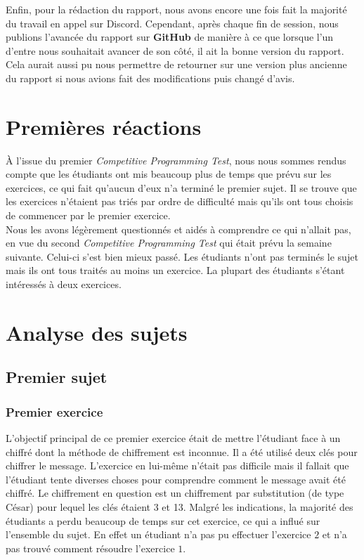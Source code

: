 \documentclass[12pt]{article}
\begin{document}
Enfin, pour la rédaction du rapport, nous avons encore une fois fait la majorité du travail en appel sur Discord. Cependant, après chaque fin de session, nous publions l'avancée du rapport sur \textbf{GitHub} de manière à ce que lorsque l'un d'entre nous souhaitait avancer de son côté, il ait la bonne version du rapport. Cela aurait aussi pu nous permettre de retourner sur une version plus ancienne du rapport si nous avions fait des modifications puis changé d'avis.
\pagebreak

\section{Premières réactions}
À l'issue du premier \textsl{Competitive Programming Test}, nous nous sommes rendus compte que les étudiants ont mis beaucoup plus de temps que prévu sur les exercices, ce qui fait qu'aucun d'eux n'a terminé le premier sujet. Il se trouve que les exercices n'étaient pas triés par ordre de difficulté mais qu'ils ont tous choisis de commencer par le premier exercice.\\
Nous les avons légèrement questionnés et aidés à comprendre ce qui n'allait pas, en vue du second \textsl{Competitive Programming Test} qui était prévu la semaine suivante. Celui-ci s'est bien mieux passé. Les étudiants n'ont pas terminés le sujet mais ils ont tous traités au moins un exercice. La plupart des étudiants s'étant intéressés à deux exercices.

\section{Analyse des sujets}
\subsection{Premier sujet}
\subsubsection{Premier exercice}


L'objectif principal de ce premier exercice était de mettre l'étudiant face à un chiffré dont la méthode de chiffrement est inconnue. Il a été utilisé deux clés pour chiffrer le message. L'exercice en lui-même n'était pas difficile mais il fallait que l'étudiant tente diverses choses pour comprendre comment le message avait été chiffré. Le chiffrement en question est un chiffrement par substitution (de type César) pour lequel les clés étaient \textsf{3} et \textsf{13}. Malgré les indications, la majorité des étudiants a perdu beaucoup de temps sur cet exercice, ce qui a influé sur l'ensemble du sujet. En effet un étudiant n'a pas pu effectuer l'exercice $2$ et n'a pas trouvé comment résoudre l'exercice $1$.
\end{document}
